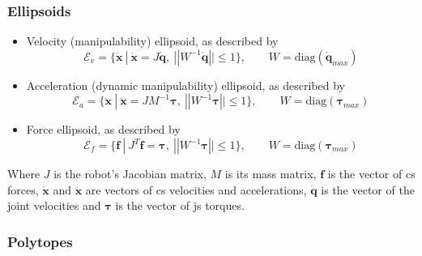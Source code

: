 \subsubsection*{Ellipsoids}
\begin{itemize}
\itemindent=-13pt
\item  Velocity (manipulability) ellipsoid, as described by \citet{yoshikawa1985manipulability} 
\begin{equation}\label{eq:ev_r}
\mathcal{E}_{v} = \{\dot{\bm{x}} ~| ~\dot{\bm{x}} = J\dot{\bm{q}},~ ||W^{-1}\dot{\bm{q}}||\leq1 \}, \qquad W = \text{diag}(\dot{\bm{q}}_{max})
\end{equation}
\item  Acceleration (dynamic manipulability) ellipsoid, as described by \citet{chiacchio_2000}
\begin{equation}\label{eq:ea_r}
\mathcal{E}_{a} = \{\ddot{\bm{x}} ~| ~\ddot{\bm{x}} = JM^{-1}\bm{\tau},~ ||W^{-1}\bm{\tau}||\leq1 \}, \qquad W = \text{diag}(\bm{\tau}_{max})
\end{equation}
\item  Force ellipsoid, as described by \citet{Chiacchio1997Force}
\begin{equation}\label{eq:ef_r}
\mathcal{E}_{f} = \{\bm{f} ~| ~J^{T}\bm{f} = \bm{\tau},~ ||W^{-1}\bm{\tau}||\leq1 \}, \qquad W = \text{diag}(\bm{\tau}_{max})
\end{equation}
\end{itemize}

Where $J$ is the robot's Jacobian matrix, $M$ is its mass matrix, $\bm{f}$ is the vector of \gls{cs} forces, $\dot{\bm{x}}$ and $\ddot{\bm{x}}$ are vectors of \gls{cs} velocities and accelerations, $\dot{\bm{q}}$ is the vector of the joint velocities and $\bm{\tau}$ is the vector of \gls{js} torques.

\subsubsection*{Polytopes}

